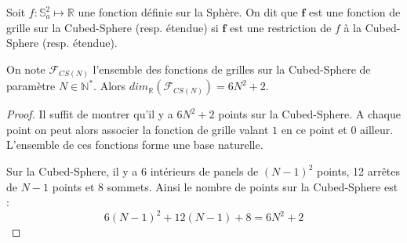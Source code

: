 \begin{definition}
Soit $f : \mathbb{S}_a^2 \mapsto \mathbb{R}$ une fonction définie sur la Sphère. On dit que $\mathbf{f}$ est une fonction de grille sur la Cubed-Sphere (resp. étendue) si $\mathbf{f}$ est une restriction de $f$ à la Cubed-Sphere (resp. étendue). 
\end{definition}

\begin{proposition}
On note $\mathcal{F}_{CS(N)}$ l'ensemble des fonctions de grilles sur la Cubed-Sphere de paramètre $N \in \mathbb{N}^*$. Alors $dim_{\mathbb{R}}(\mathcal{F}_{CS(N)}) = 6N^2+2$.
\end{proposition}

\begin{proof}
Il suffit de montrer qu'il y a $6N^2+2$ points sur la Cubed-Sphere. A chaque point on peut alors associer la fonction de grille valant $1$ en ce point et $0$ ailleur. L'ensemble de ces fonctions forme une base naturelle.

Sur la Cubed-Sphere, il y a 6 intérieurs de panels de $(N-1)^2$ points, 12 arrêtes de $N-1$ points et 8 sommets. Ainsi le nombre de points sur la Cubed-Sphere est :
$$
6 (N-1)^2 + 12 (N-1)+8=6N^2+2
$$
\end{proof}




































